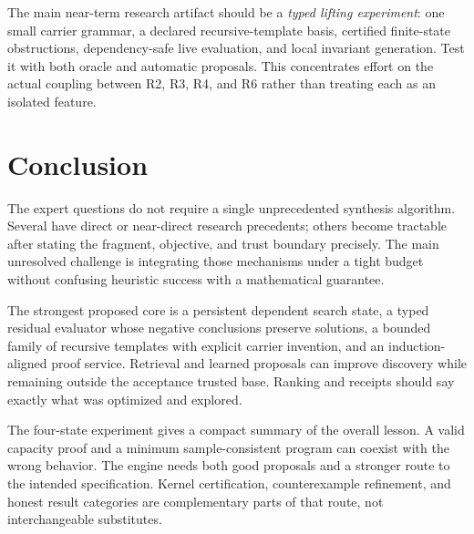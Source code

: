 \documentclass[11pt,a4paper]{article}
\theoremstyle{remark}
\begin{document}
The main near-term research artifact should be a \emph{typed lifting experiment}: one small carrier grammar, a declared recursive-template basis, certified finite-state obstructions, dependency-safe live evaluation, and local invariant generation. Test it with both oracle and automatic proposals. This concentrates effort on the actual coupling between R2, R3, R4, and R6 rather than treating each as an isolated feature.

\section{Conclusion}

The expert questions do not require a single unprecedented synthesis algorithm. Several have direct or near-direct research precedents; others become tractable after stating the fragment, objective, and trust boundary precisely. The main unresolved challenge is integrating those mechanisms under a tight budget without confusing heuristic success with a mathematical guarantee.

The strongest proposed core is a persistent dependent search state, a typed residual evaluator whose negative conclusions preserve solutions, a bounded family of recursive templates with explicit carrier invention, and an induction-aligned proof service. Retrieval and learned proposals can improve discovery while remaining outside the acceptance trusted base. Ranking and receipts should say exactly what was optimized and explored.

The four-state experiment gives a compact summary of the overall lesson. A valid capacity proof and a minimum sample-consistent program can coexist with the wrong behavior. The engine needs both good proposals and a stronger route to the intended specification. Kernel certification, counterexample refinement, and honest result categories are complementary parts of that route, not interchangeable substitutes.

\appendix
\end{document}
